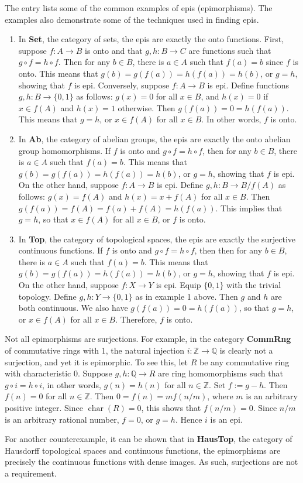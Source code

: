 \documentclass[12pt]{article}
\begin{document}
The entry lists some of the common examples of epis (epimorphisms).  The examples also demonstrate some of the techniques used in finding epis.

\begin{enumerate}
\item In \textbf{Set}, the category of sets, the epis are exactly the onto functions.  First, suppose $f:A\to B$ is onto and that $g,h:B\to C$ are functions such that $g\circ f=h\circ f$.  Then for any $b\in B$, there is $a\in A$ such that $f(a)=b$ since $f$ is onto.  This means that $g(b)=g(f(a))= h(f(a))=h(b)$, or $g=h$, showing that $f$ is epi.  Conversely, suppose $f:A\to B$ is epi.  Define functions $g,h:B\to \lbrace 0,1\rbrace$ as follows: $g(x)=0$ for all $x\in B$, and $h(x)=0$ if $x\in f(A)$ and $h(x)=1$ otherwise.  Then $g(f(a))=0=h(f(a))$.  This means that $g=h$, or $x\in f(A)$ for all $x\in B$.  In other words, $f$ is onto.
\item In \textbf{Ab}, the category of abelian groups, the epis are exactly the onto abelian group homomorphisms.  If $f$ is onto and $g\circ f =h\circ f$, then for any $b\in B$, there is $a\in A$ such that $f(a)=b$.  This means that $g(b)=g(f(a))=h(f(a))=h(b)$, or $g=h$, showing that $f$ is epi.  On the other hand, suppose $f:A\to B$ is epi.  Define $g,h:B\to B/f(A)$ as follows: $g(x)=f(A)$ and $h(x)=x+f(A)$ for all $x\in B$.  Then $g(f(a))=f(A)=f(a)+f(A)=h(f(a))$.  This implies that $g=h$, so that $x\in f(A)$ for all $x\in B$, or $f$ is onto.
\item In \textbf{Top}, the category of topological spaces, the epis are exactly the surjective continuous functions.  If $f$ is onto and $g\circ f=h\circ f$, then then for any $b\in B$, there is $a\in A$ such that $f(a)=b$.  This means that $g(b)=g(f(a))=h(f(a))=h(b)$, or $g=h$, showing that $f$ is epi.  On the other hand, suppose $f:X\to Y$ is epi.  Equip $\lbrace 0,1\rbrace$ with the trivial topology.  Define $g,h:Y\to \lbrace 0,1\rbrace$ as in example 1 above.  Then $g$ and $h$ are both continuous.  We also have $g(f(a))=0=h(f(a))$, so that $g=h$, or $x\in f(A)$ for all $x\in B$.  Therefore, $f$ is onto.
\end{enumerate}

Not all epimorphisms are surjections.  For example, in the category \textbf{CommRng} of commutative rings with 1, the natural injection $i:\mathbb{Z}\to \mathbb{Q}$ is clearly not a surjection, and yet it is epimorphic.  To see this, let $R$ be any commutative ring with characteristic $0$.  Suppose $g,h:\mathbb{Q}\to R$ are ring homomorphisms such that $g\circ i=h\circ i$, in other words, $g(n)=h(n)$ for all $n\in \mathbb{Z}$.  Set $f:=g-h$.  Then $f(n)=0$ for all $n\in \mathbb{Z}$.  Then $0=f(n)=mf(n/m)$, where $m$ is an arbitrary positive integer.  Since $\operatorname{char}(R)=0$, this shows that $f(n/m)=0$.  Since $n/m$ is an arbitrary rational number, $f=0$, or $g=h$.  Hence $i$ is an epi.

For another counterexample, it can be shown that in \textbf{HausTop}, the category of Hausdorff topological spaces and continuous functions, the epimorphisms are precisely the continuous functions with dense images.  As such, surjections are not a requirement.
\end{document}
